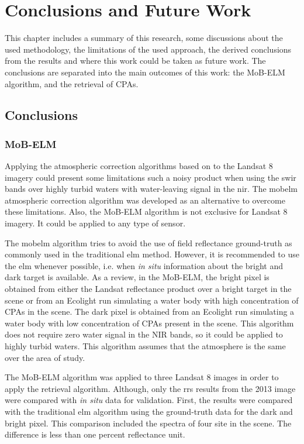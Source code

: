 \chapter{Conclusions and Future Work}
\label{ch:conc_future}
This chapter includes a summary of this research, some discussions about the used methodology, the limitations of the used approach, the derived conclusions from the results and where this work could be taken as future work. The conclusions are separated into the main outcomes of this work: the MoB-ELM algorithm, and the retrieval of CPAs.

\section{Conclusions}
\label{sec:conc}
\subsection{MoB-ELM}
Applying the atmospheric correction algorithms based on \cite{Gordon:1994} to the Landsat 8 imagery could present some limitations such a noisy product when using the \gls{swir} bands over highly turbid waters with water-leaving signal in the \gls{nir}. The \gls{mobelm} atmospheric correction algorithm \cite{Concha2014SPIE} was developed as an alternative to overcome these limitations. Also, the MoB-ELM algorithm is not exclusive for Landsat 8 imagery. It could be applied to any type of sensor.

The \gls{mobelm} algorithm tries to avoid the use of field reflectance ground-truth as commonly used in the traditional \gls{elm} method. However, it is recommended to use the \gls{elm} whenever possible, i.e. when {\it in situ} information about the bright and dark target is available. As a review, in the MoB-ELM, the bright pixel is obtained from either the Landsat reflectance product over a bright target in the scene or from an Ecolight run simulating a water body with high concentration of CPAs in the scene. The dark pixel is obtained from an Ecolight run simulating a water body with low concentration of CPAs present in the scene. This algorithm does not require zero water signal in the NIR bands, so it could be applied to highly turbid waters. This algorithm assumes that the atmosphere is the same over the area of study.

The MoB-ELM algorithm was applied to {three } Landsat 8 images in order to apply the retrieval algorithm. Although, only the \gls{rrs} results from the 2013 image were compared with {\it in situ} data for validation. First, the results were compared with the traditional \gls{elm} algorithm using the ground-truth data for the dark and bright pixel. This comparison included the spectra of four site in the scene. The difference is less than one percent reflectance unit. 

